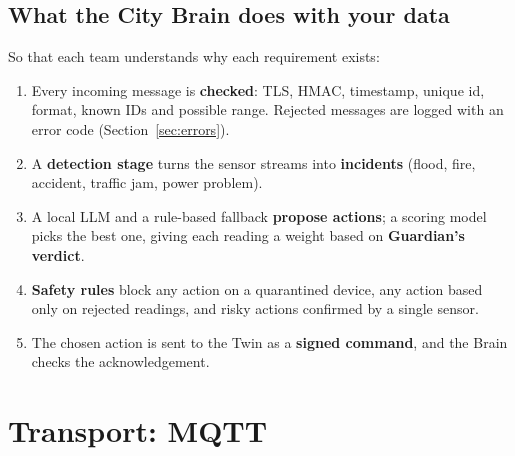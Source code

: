 \documentclass[11pt,a4paper]{article}
\begin{document}
\subsection{What the City Brain does with your data}
So that each team understands why each requirement exists:
\begin{enumerate}
  \item Every incoming message is \textbf{checked}: TLS, HMAC, timestamp, unique id, format, known IDs and possible range. Rejected messages are logged with an error code (Section~\ref{sec:errors}).
  \item A \textbf{detection stage} turns the sensor streams into \textbf{incidents} (flood, fire, accident, traffic jam, power problem).
  \item A local LLM and a rule-based fallback \textbf{propose actions}; a scoring model picks the best one, giving each reading a weight based on \textbf{Guardian's verdict}.
  \item \textbf{Safety rules} block any action on a quarantined device, any action based only on rejected readings, and risky actions confirmed by a single sensor.
  \item The chosen action is sent to the Twin as a \textbf{signed command}, and the Brain checks the acknowledgement.
\end{enumerate}

\section{Transport: MQTT}
\end{document}
